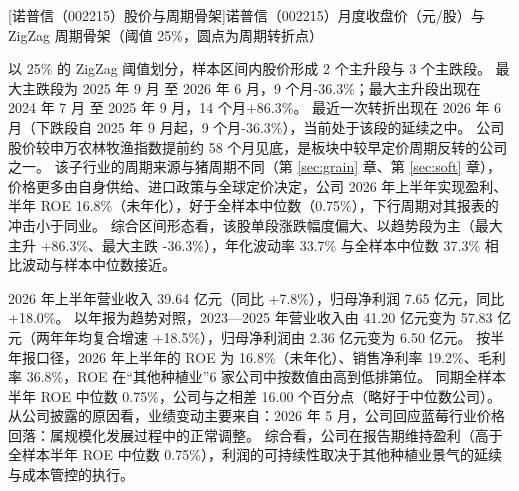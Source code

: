 \begin{center}
\begin{minipage}{\textwidth}\centering
{}

[诺普信（002215）股价与周期骨架]{诺普信（002215）月度收盘价（元/股）与 ZigZag 周期骨架（阈值 25\%，圆点为周期转折点）}
\end{minipage}
\end{center}

 以 25\% 的 ZigZag 阈值划分，样本区间内股价形成 2 个主升段与 3 个主跌段。 最大主跌段为 2025 年 9 月 至 2026 年 6 月，9 个月-36.3\%；最大主升段出现在 2024 年 7 月 至 2025 年 9 月，14 个月+86.3\%。 最近一次转折出现在 2026 年 6 月（下跌段自 2025 年 9 月起，9 个月-36.3\%），当前处于该段的延续之中。 公司股价较申万农林牧渔指数提前约 58 个月见底，是板块中较早定价周期反转的公司之一。 该子行业的周期来源与猪周期不同（第 \ref{sec:grain} 章、第 \ref{sec:soft} 章），价格更多由自身供给、进口政策与全球定价决定，公司 2026 年上半年实现盈利、半年 ROE 16.8\%（未年化），好于全样本中位数（0.75\%），下行周期对其报表的冲击小于同业。 综合区间形态看，该股单段涨跌幅度偏大、以趋势段为主（最大主升 +86.3\%、最大主跌 -36.3\%），年化波动率 33.7\% 与全样本中位数 37.3\% 相比波动与样本中位数接近。

 2026 年上半年营业收入 39.64 亿元（同比 +7.8\%），归母净利润 7.65 亿元，同比 +18.0\%。 以年报为趋势对照，2023---2025 年营业收入由 41.20 亿元变为 57.83 亿元（两年年均复合增速 +18.5\%），归母净利润由 2.36 亿元变为 6.50 亿元。 按半年报口径，2026 年上半年的 ROE 为 16.8\%（未年化）、销售净利率 19.2\%、毛利率 36.8\%，ROE 在“其他种植业”6 家公司中按数值由高到低排第位。 同期全样本半年 ROE 中位数 0.75\%，公司与之相差 16.00 个百分点（略好于中位数公司）。 从公司披露的原因看，业绩变动主要来自：2026 年 5 月，公司回应蓝莓行业价格回落：属规模化发展过程中的正常调整。 综合看，公司在报告期维持盈利（高于全样本半年 ROE 中位数 0.75\%），利润的可持续性取决于其他种植业景气的延续与成本管控的执行。

